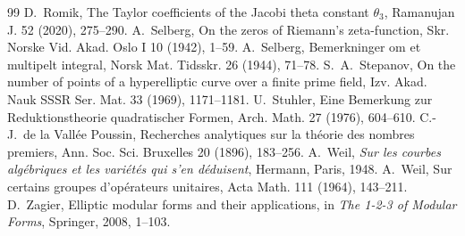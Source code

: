 \documentclass[11pt,letterpaper]{article}
\numberwithin{equation}{section}
\begin{document}
\begin{thebibliography}{99}
 D.~Romik, The Taylor coefficients of the Jacobi theta constant $\theta_3$, Ramanujan J. 52 (2020), 275--290.
 A.~Selberg, On the zeros of Riemann's zeta-function, Skr. Norske Vid. Akad. Oslo I 10 (1942), 1--59.
 A.~Selberg, Bemerkninger om et multipelt integral, Norsk Mat. Tidsskr. 26 (1944), 71--78.
 S.~A.~Stepanov, On the number of points of a hyperelliptic curve over a finite prime field, Izv. Akad. Nauk SSSR Ser. Mat. 33 (1969), 1171--1181.
 U.~Stuhler, Eine Bemerkung zur Reduktionstheorie quadratischer Formen, Arch. Math. 27 (1976), 604--610.
 C.-J.~de la Vall\'ee Poussin, Recherches analytiques sur la th\'eorie des nombres premiers, Ann. Soc. Sci. Bruxelles 20 (1896), 183--256.
 A.~Weil, \emph{Sur les courbes alg\'ebriques et les vari\'et\'es qui s'en d\'eduisent}, Hermann, Paris, 1948.
 A.~Weil, Sur certains groupes d'op\'erateurs unitaires, Acta Math. 111 (1964), 143--211.
 D.~Zagier, Elliptic modular forms and their applications, in \emph{The 1-2-3 of Modular Forms}, Springer, 2008, 1--103.
\end{thebibliography}
\end{document}
